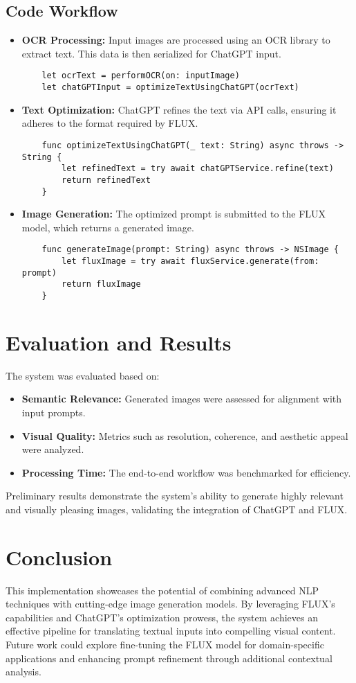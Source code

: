 \subsection{Code Workflow}
\begin{itemize}
    \item \textbf{OCR Processing:} Input images are processed using an OCR library to extract text. This data is then serialized for ChatGPT input.
    \begin{verbatim}
    let ocrText = performOCR(on: inputImage)
    let chatGPTInput = optimizeTextUsingChatGPT(ocrText)
    \end{verbatim}
    \item \textbf{Text Optimization:} ChatGPT refines the text via API calls, ensuring it adheres to the format required by FLUX.
    \begin{verbatim}
    func optimizeTextUsingChatGPT(_ text: String) async throws -> String {
        let refinedText = try await chatGPTService.refine(text)
        return refinedText
    }
    \end{verbatim}
    \item \textbf{Image Generation:} The optimized prompt is submitted to the FLUX model, which returns a generated image.
    \begin{verbatim}
    func generateImage(prompt: String) async throws -> NSImage {
        let fluxImage = try await fluxService.generate(from: prompt)
        return fluxImage
    }
    \end{verbatim}
\end{itemize}

\section{Evaluation and Results}
The system was evaluated based on:
\begin{itemize}
    \item \textbf{Semantic Relevance:} Generated images were assessed for alignment with input prompts.
    \item \textbf{Visual Quality:} Metrics such as resolution, coherence, and aesthetic appeal were analyzed.
    \item \textbf{Processing Time:} The end-to-end workflow was benchmarked for efficiency.
\end{itemize}
Preliminary results demonstrate the system's ability to generate highly relevant and visually pleasing images, validating the integration of ChatGPT and FLUX.

\section{Conclusion}
This implementation showcases the potential of combining advanced NLP techniques with cutting-edge image generation models. By leveraging FLUX's capabilities and ChatGPT's optimization prowess, the system achieves an effective pipeline for translating textual inputs into compelling visual content. Future work could explore fine-tuning the FLUX model for domain-specific applications and enhancing prompt refinement through additional contextual analysis.